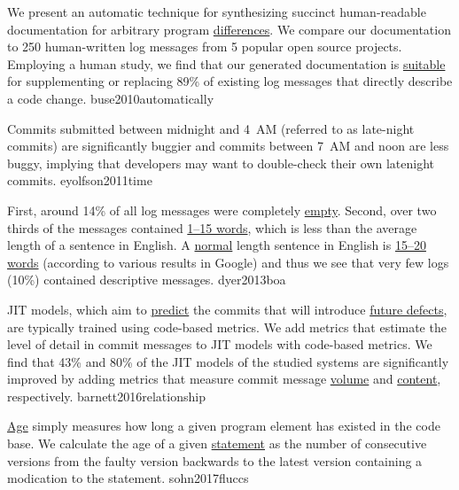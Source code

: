 \documentclass{article}
\begin{document}
  {We present an automatic technique for synthesizing succinct human-readable documentation for arbitrary program \ul{differences}. We compare our documentation to 250 human-written log messages from 5 popular open source projects. Employing a human study, we find that our generated documentation is \ul{suitable} for supplementing or replacing 89\% of existing log messages that directly describe a code change.}
  {buse2010automatically}

  {Commits submitted between midnight and 4~AM (referred to as late-night commits) are significantly buggier and commits between 7~AM and noon are less buggy, implying that developers may want to double-check their own latenight commits.}
  {eyolfson2011time}

  {First, around 14\% of all log messages were completely \ul{empty}. Second, over two thirds of the messages contained \ul{1–15 words}, which is less than the average length of a sentence in English. A \ul{normal} length sentence in English is \ul{15–20 words} (according to various results in Google) and thus we see that very few logs (10\%) contained descriptive messages.}
  {dyer2013boa}

  {JIT models, which aim to \ul{predict} the commits that will introduce \ul{future defects}, are typically trained using code-based metrics. We add metrics that estimate the level of detail in commit messages to JIT models with code-based metrics. We find that 43\% and 80\% of the JIT models of the studied systems are significantly improved by adding metrics that measure commit message \ul{volume} and \ul{content}, respectively.}
  {barnett2016relationship}

  {\ul{Age} simply measures how long a given program element has existed in the code base. We calculate the age of a given \ul{statement} as the number of consecutive versions from the faulty version backwards to the latest version containing a modication to the statement.}
  {sohn2017fluccs}
\end{document}
